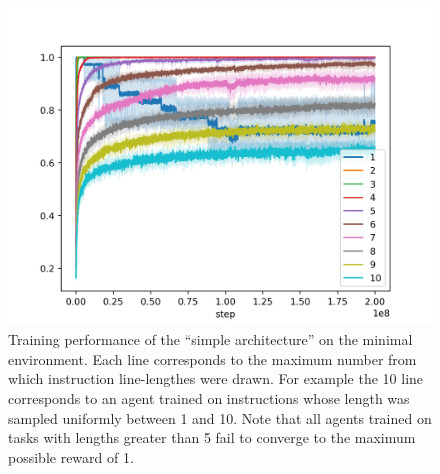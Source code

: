 \documentclass{article}
\begin{document}
\begin{figure}[t]
\vskip 0.2in
\centerline{\includegraphics[width=\columnwidth]{simple-rewards}}
\caption{Training performance of the ``simple architecture'' on the minimal
environment. Each line corresponds to the maximum number from which
instruction line-lengthes were drawn. For example the 10 line corresponds to an
agent trained on instructions whose length was sampled uniformly between 1 and
10. Note that all agents trained on tasks with lengths greater than 5 fail to
converge to the maximum possible reward of 1.}
\label{grammer}
\vskip -0.2in
\end{figure}
\end{document}

